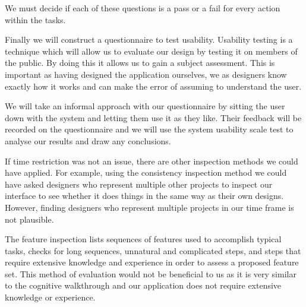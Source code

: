 We must decide if each of these questions is a pass or a fail for every action
within the tasks.

Finally we will construct a questionnaire to test usability.  Usability testing
is a technique which will allow us to evaluate our design by testing it on
members of the public. By doing this it allows us to gain a subject assessment.
This is important as having designed the application ourselves, we as designers
know exactly how it works and can make the error of assuming to understand the
user.

We will take an informal approach with our questionnaire by sitting the user
down with the system and letting them use it as they like. Their feedback will
be recorded on the questionnaire and we will use the system usability scale
test to analyse our results and draw any conclusions.

If time restriction was not an issue, there are other inspection methods we
could have applied.  For example, using the consistency inspection method we
could have asked designers who represent multiple other projects to inspect our
interface to see whether it does things in the same way as their own designs.
However, finding designers who represent multiple projects in our time frame is
not plausible.

The feature inspection lists sequences of features used to accomplish typical
tasks, checks for long sequences, unnatural and complicated steps, and steps
that require extensive knowledge and experience in order to assess a proposed
feature set. This method of evaluation would not be beneficial to us as it is
very similar to the cognitive walkthrough and our application does not require
extensive knowledge or experience.
